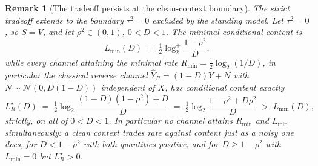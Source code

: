 ﻿\documentclass[11pt,onecolumn]{IEEEtran}
\newtheorem{remark}[theorem]{Remark}
\newcommand{\hY}{\widehat{Y}}
\newcommand{\LRs}{L_{R}^{\star}}
\begin{document}
\begin{remark}[The tradeoff persists at the clean-context boundary]
\label{rem:cleanboundary}
The strict tradeoff extends to the boundary $\tau^2=0$ excluded by the
standing model. Let $\tau^2=0$, so $S=V$, and let $\rho^2\in(0,1)$,
$0<D<1$. The minimal conditional content is
\begin{equation}
L_{\min}(D)\;=\;\tfrac12\log_2^{+}\frac{1-\rho^2}{D},
\label{eq:cleanmin}
\end{equation}
while \emph{every} channel attaining the minimal rate
$R_{\min}=\tfrac12\log_2(1/D)$, in particular the classical reverse
channel $\hY_R=(1-D)Y+N$ with $N\sim\mathcal N(0,D(1-D))$ independent
of $X$, has conditional content exactly
\begin{equation}
\LRs(D)\;=\;\tfrac12\log_2\frac{(1-D)(1-\rho^2)+D}{D}
\;=\;\tfrac12\log_2\frac{1-\rho^2+D\rho^2}{D}\;>\;L_{\min}(D),
\label{eq:cleanrev}
\end{equation}
strictly, on all of $0<D<1$. In particular no channel attains
$R_{\min}$ and $L_{\min}$ simultaneously: a clean context trades rate
against content just as a noisy one does, for $D<1-\rho^2$ with both
quantities positive, and for $D\ge1-\rho^2$ with $L_{\min}=0$ but
$\LRs>0$.
\end{remark}
\end{document}
